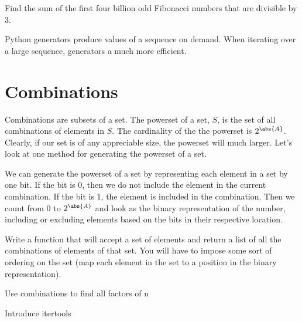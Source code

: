 \label{lab:Python_Generators}


\begin{problem}
Find the sum of the first four billion odd Fibonacci numbers that are divisible by 3.
\end{problem}


Python generators produce values of a sequence on demand.  When iterating over a large
sequence, generators a much more efficient.

\section*{Combinations}
Combinations are subsets of a set.  The powerset of a set, $S$, is the set of all combinations
of elements in $S$.  The cardinality of the the powerset is $2^{\abs{A}}$.  Clearly, if our
set is of any appreciable size, the powerset will much larger.  Let's look at one method for
generating the powerset of a set.

We can generate the powerset of a set by representing each element in a set by one bit.
If the bit is 0, then we do not include the element in the current combination.  If the
bit is 1, the element is included in the combination.  Then we count from 0 to $2^{\abs{A}}$
and look as the binary representation of the number, including or excluding elements based
on the bits in their respective location.

\begin{problem}
Write a function that will accept a set of elements and return a list of all the combinations
of elements of that set.  You will have to impose some sort of ordering on the set (map each element
in the set to a position in the binary representation).
\end{problem}


Use combinations to find all factors of n

Introduce itertools